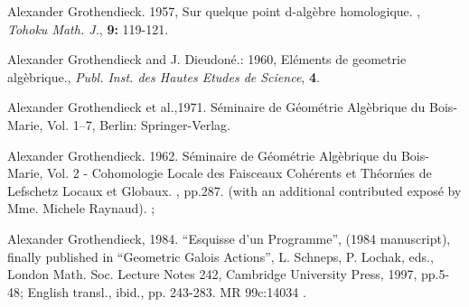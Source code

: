 \documentclass[12pt]{article}
\begin{document}
\begin{thebibliography}{99}

Alexander Grothendieck. 1957, Sur quelque point d-alg\`{e}bre homologique. , \emph{Tohoku Math. J.}, \textbf{9:} 119-121.

Alexander Grothendieck and J. Dieudon\'{e}.: 1960, El\'{e}ments de geometrie alg\`{e}brique., \emph{Publ. Inst. des Hautes Etudes de Science}, \textbf{4}.

Alexander Grothendieck et al.,1971. S\'eminaire de G\'eom\'etrie Alg\`ebrique du Bois-Marie, Vol. 1--7, Berlin: Springer-Verlag.

Alexander Grothendieck. 1962. S\'eminaire de G\'eom\'etrie Alg\`ebrique du Bois-Marie, Vol. 2 - Cohomologie Locale des Faisceaux Coh\'erents et Th\'eor\'mes de Lefschetz Locaux et Globaux. , pp.287. (with an additional contributed expos\'e by Mme. Michele Raynaud).
;


Alexander Grothendieck, 1984. ``Esquisse d'un Programme'', (1984 manuscript), finally published in ``Geometric Galois Actions'', L. Schneps, P. Lochak, eds., London Math. Soc. Lecture Notes 242, Cambridge University Press, 1997, pp.5-48; English transl., ibid., pp. 243-283. MR 99c:14034 . 

\end{thebibliography}
\end{document}

